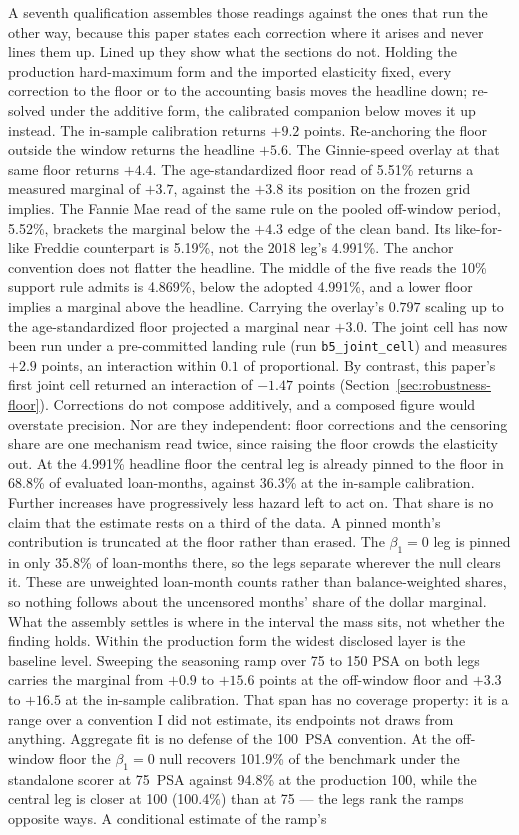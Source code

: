 \documentclass[12pt]{article}
\begin{document}
A seventh qualification assembles those readings against the ones that run the other way, because this paper states each correction where it arises and never lines them up. Lined up they show what the sections do not. Holding the production hard-maximum form and the imported elasticity fixed, every correction to the floor or to the accounting basis moves the headline down; re-solved under the additive form, the calibrated companion below moves it up instead. The in-sample calibration returns $+9.2$ points. Re-anchoring the floor outside the window returns the headline $+5.6$. The Ginnie-speed overlay at that same floor returns $+4.4$. The age-standardized floor read of 5.51\% returns a measured marginal of $+3.7$, against the $+3.8$ its position on the frozen grid implies. The Fannie Mae read of the same rule on the pooled off-window period, 5.52\%, brackets the marginal below the $+4.3$ edge of the clean band. Its like-for-like Freddie counterpart is 5.19\%, not the 2018 leg's 4.991\%. The anchor convention does not flatter the headline. The middle of the five reads the 10\% support rule admits is 4.869\%, below the adopted 4.991\%, and a lower floor implies a marginal above the headline. Carrying the overlay's $0.797$ scaling up to the age-standardized floor projected a marginal near $+3.0$. The joint cell has now been run under a pre-committed landing rule (run \texttt{b5\_joint\_cell}) and measures $+2.9$ points, an interaction within $0.1$ of proportional. By contrast, this paper's first joint cell returned an interaction of $-1.47$ points (Section~\ref{sec:robustness-floor}). Corrections do not compose additively, and a composed figure would overstate precision. Nor are they independent: floor corrections and the censoring share are one mechanism read twice, since raising the floor crowds the elasticity out. At the 4.991\% headline floor the central leg is already pinned to the floor in 68.8\% of evaluated loan-months, against 36.3\% at the in-sample calibration. Further increases have progressively less hazard left to act on. That share is no claim that the estimate rests on a third of the data. A pinned month's contribution is truncated at the floor rather than erased. The $\beta_1 = 0$ leg is pinned in only 35.8\% of loan-months there, so the legs separate wherever the null clears it. These are unweighted loan-month counts rather than balance-weighted shares, so nothing follows about the uncensored months' share of the dollar marginal. What the assembly settles is where in the interval the mass sits, not whether the finding holds. Within the production form the widest disclosed layer is the baseline level. Sweeping the seasoning ramp over 75 to 150 PSA on both legs carries the marginal from $+0.9$ to $+15.6$ points at the off-window floor and $+3.3$ to $+16.5$ at the in-sample calibration. That span has no coverage property: it is a range over a convention I did not estimate, its endpoints not draws from anything. Aggregate fit is no defense of the 100~PSA convention. At the off-window floor the $\beta_1 = 0$ null recovers 101.9\% of the benchmark under the standalone scorer at 75~PSA against 94.8\% at the production 100, while the central leg is closer at 100 (100.4\%) than at 75 --- the legs rank the ramps opposite ways. A conditional estimate of the ramp's 
\end{document}

